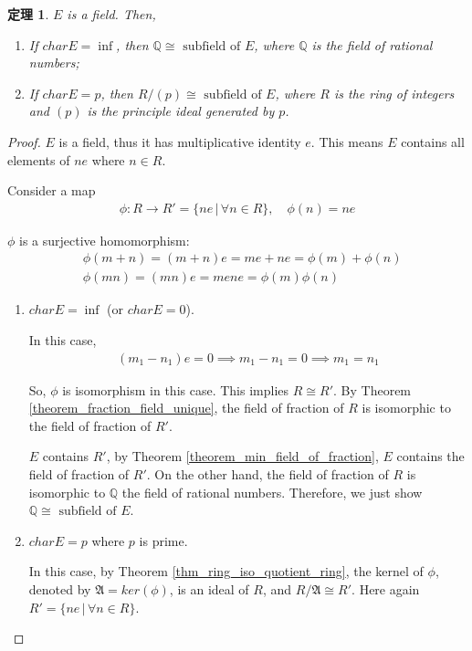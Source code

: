 \documentclass[utf8]{ctexbook}
\newtheorem{theorem}{定理}[section]
\begin{document}
\begin{theorem}\label{thm_4_1_field_extension_iso}
$E$ is a field. Then,
\begin{enumerate}
\item{If $char E = \inf$, then $\mathbb{Q} \cong \mbox{ subfield of } E$, where $\mathbb{Q}$ is the field of rational numbers;}
\item{If $char E = p$, then $R/(p) \cong \mbox{ subfield of } E$, where $R$ is the ring of integers and $(p)$ is the principle ideal generated by $p$.}
\end{enumerate}
\end{theorem}

\begin{proof}
$E$ is a field, thus it has multiplicative identity $e$. This means $E$ contains all elements of $ne$ where $n \in R$.

Consider a map
\begin{align*}
\phi : R \longrightarrow R' = \{ ne \, | \, \forall n \in R \} , \quad  \phi(n) = ne
\end{align*} 

$\phi$ is a surjective homomorphism:
\begin{align*}
& \phi(m+n) = (m+n)e = me + ne = \phi(m) + \phi(n) \\
& \phi(mn) = (mn)e = me ne = \phi(m) \phi(n)
\end{align*}

\begin{enumerate}
\item{$char E = \inf $ (or $char E = 0$).

In this case,
\begin{align*}
(m_1 - n_1 ) e = 0 \implies m_1 - n_1 = 0 \implies m_1 = n_1
\end{align*}

So, $\phi$ is isomorphism in this case. This implies $R \cong R'$. By Theorem \ref{theorem_fraction_field_unique}, the field of fraction of $R$ is isomorphic to the field of fraction of $R'$. 

$E$ contains $R'$, by Theorem \ref{theorem_min_field_of_fraction}, $E$ contains the field of fraction of $R'$. On the other hand, the field of fraction of $R$ is isomorphic to $\mathbb{Q}$ the field of rational numbers. Therefore, we just show $\mathbb{Q} \cong \mbox{ subfield of } E$.
}
\item{$char E = p$ where $p$ is prime.

In this case, by Theorem \ref{thm_ring_iso_quotient_ring}, the kernel of $\phi$, denoted by $\mathfrak{A} = ker (\phi)$, is an ideal of $R$, and $R / \mathfrak{A} \cong R'$. Here again $R' = \{ ne\, | \, \forall n \in R \}$. 

}
\end{enumerate}
\end{proof}
\end{document}
